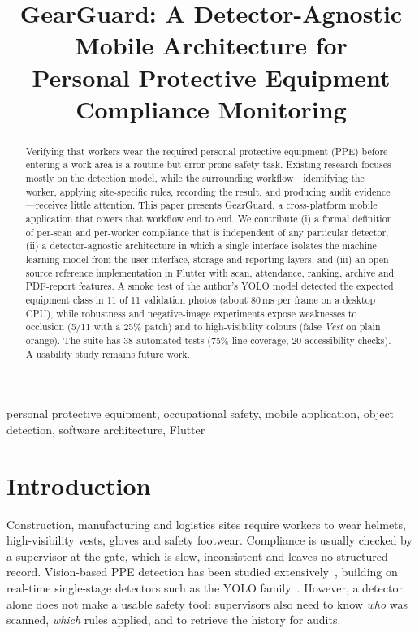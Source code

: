 \documentclass[conference]{IEEEtran}
\begin{document}
\title{GearGuard: A Detector-Agnostic Mobile Architecture for\\
Personal Protective Equipment Compliance Monitoring}

\author{
}

\maketitle

\begin{abstract}
Verifying that workers wear the required personal protective equipment (PPE)
before entering a work area is a routine but error-prone safety task. Existing
research focuses mostly on the detection model, while the surrounding
workflow---identifying the worker, applying site-specific rules, recording the
result, and producing audit evidence---receives little attention. This paper
presents GearGuard, a cross-platform mobile application that covers that
workflow end to end. We contribute (i) a formal definition of per-scan and
per-worker compliance that is independent of any particular detector, (ii) a
detector-agnostic architecture in which a single interface isolates the machine
learning model from the user interface, storage and reporting layers, and
(iii) an open-source reference implementation in Flutter with scan, attendance,
ranking, archive and PDF-report features.
A smoke test of the author's YOLO model detected the expected equipment class in 11 of 11 validation photos (about 80\,ms per frame on a desktop CPU), while robustness and negative-image experiments expose weaknesses to occlusion (5/11 with a 25\% patch) and to high-visibility colours (false \emph{Vest} on plain orange). The suite has 38 automated tests (75\% line coverage, 20 accessibility checks). A usability study remains future work.
\end{abstract}

\begin{IEEEkeywords}
personal protective equipment, occupational safety, mobile application,
object detection, software architecture, Flutter
\end{IEEEkeywords}

\section{Introduction}
Construction, manufacturing and logistics sites require workers to wear
helmets, high-visibility vests, gloves and safety footwear. Compliance is
usually checked by a supervisor at the gate, which is slow, inconsistent and
leaves no structured record. Vision-based PPE detection has been studied
extensively~\cite{wang2021chv,karlsson2022,ordrick2025}, building on real-time
single-stage detectors such as the YOLO
family~\cite{wang2023yolov7,jocher2023yolov8}. However, a detector alone does not make a usable safety
tool: supervisors also need to know \emph{who} was scanned, \emph{which} rules
applied, and to retrieve the history for audits.
\end{document}
